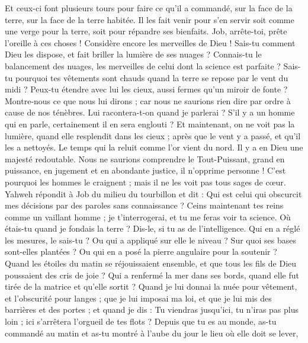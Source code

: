 \begin{multicols}{2}
Et ceux-ci font plusieurs tours pour faire ce qu'il a commandé, sur la face de la terre, sur la face de la terre habitée.
Il les fait venir pour s'en servir soit comme une verge pour la terre, soit pour répandre ses bienfaits.
Job, arrête-toi, prête l'oreille à ces choses ! Considère encore les merveilles de Dieu !
Sais-tu comment Dieu les dispose, et fait briller la lumière de ses nuages ?
Connais-tu le balancement des nuages, les merveilles de celui dont la science est parfaite ?
Sais-tu pourquoi tes vêtements sont chauds quand la terre se repose par le vent du midi ?
Peux-tu étendre avec lui les cieux, aussi fermes qu'un miroir de fonte ?
Montre-nous ce que nous lui dirons ; car nous ne saurions rien dire par ordre à cause de nos ténèbres. 
Lui racontera-t-on quand je parlerai ? S'il y a un homme qui en parle, certainement il en sera englouti ?
Et maintenant, on ne voit pas la lumière, quand elle resplendit dans les cieux ; après que le vent y a passé, et qu'il les a nettoyés.
Le temps qui la reluit comme l'or vient du nord. Il y a en Dieu une majesté redoutable.
Nous ne saurions comprendre le Tout-Puissant, grand en puissance, en jugement et en abondante justice, il n'opprime personne !
C'est pourquoi les hommes le craignent ; mais il ne les voit pas tous sages de cœur.
\VerseOne{}Yahweh répondit à Job du milieu du tourbillon et dit :
Qui est celui qui obscurcit mes décisions par des paroles sans connaissance ?
Ceins maintenant tes reins comme un vaillant homme ; je t'interrogerai, et tu me feras voir ta science.
Où étais-tu quand je fondais la terre ? Dis-le, si tu as de l'intelligence.
Qui en a réglé les mesures, le sais-tu ? Ou qui a appliqué sur elle le niveau ?
Sur quoi ses bases sont-elles plantées ? Ou qui en a posé la pierre angulaire pour la soutenir ?
Quand les étoiles du matin se réjouissaient ensemble, et que tous les fils de Dieu poussaient des cris de joie  ?
Qui a renfermé la mer dans ses bords, quand elle fut tirée de la matrice et qu'elle sortit ? 
Quand je lui donnai la nuée pour vêtement, et l'obscurité pour langes ;
que je lui imposai ma loi, et que je lui mis des barrières et des portes ;
 et quand je dis : Tu viendras jusqu'ici, tu n'iras pas plus loin ; ici s'arrêtera l'orgueil de tes flots ?
Depuis que tu es au monde, as-tu commandé au matin et as-tu montré à l'aube du jour le lieu où elle doit se lever,

\end{multicols}
